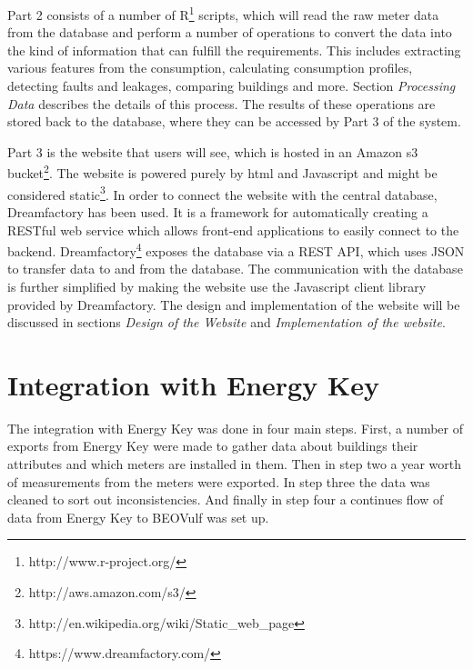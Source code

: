 Part 2 consists of a number of R\footnote{http://www.r-project.org/} scripts, which will read the raw meter data from the database and perform a number of operations to convert the data into the kind of information that can fulfill the requirements. This includes extracting various features from the consumption, calculating consumption profiles, detecting faults and leakages, comparing buildings and more. Section \emph{Processing Data} describes the details of this process. The results of these operations are stored back to the database, where they can be accessed by Part 3 of the system.

Part 3 is the website that users will see, which is hosted in an Amazon s3 bucket\footnote{http://aws.amazon.com/s3/}. The website is powered purely by html and Javascript and might be considered static\footnote{http://en.wikipedia.org/wiki/Static\_web\_page}. In order to connect the website with the central database, Dreamfactory has been used. It is a framework for automatically creating a RESTful web service which allows front-end applications to easily connect to the backend. Dreamfactory\footnote{https://www.dreamfactory.com/} exposes the database via a REST API, which uses JSON to transfer data to and from the database. The communication with the database is further simplified by making the website use the Javascript client library provided by Dreamfactory. The design and implementation of the website will be discussed in sections \emph{Design of the Website} and \emph{Implementation of the website}.
\section{Integration with Energy Key}
The integration with Energy Key was done in four main steps. First, a number of exports from Energy Key were made to gather data about buildings their attributes and which meters are installed in them. Then in step two a year worth of measurements from the meters were exported. In step three the data was cleaned to sort out inconsistencies. And finally in step four a continues flow of data from Energy Key to BEOVulf was set up.
